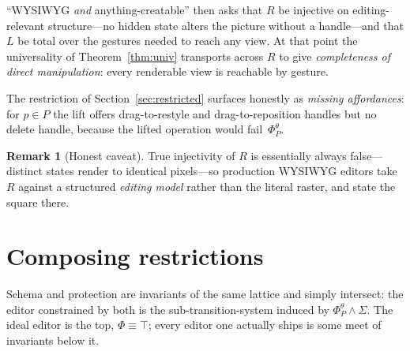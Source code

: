 \documentclass[11pt]{article}
\newcommand{\Edit}{\mathcal{E}}
\newcommand{\Render}{R}
\newcommand{\Lift}{L}
\theoremstyle{definition}
\newtheorem{remark}[definition]{Remark}
\theoremstyle{plain}
\begin{document}
``WYSIWYG \emph{and} anything-creatable'' then asks that $\Render$ be injective
on editing-relevant structure---no hidden state alters the picture without a
handle---and that $\Lift$ be total over the gestures needed to reach any view. At
that point the universality of Theorem~\ref{thm:univ} transports across
$\Render$ to give \emph{completeness of direct manipulation}: every renderable
view is reachable by gesture.

The restriction of Section~\ref{sec:restricted} surfaces honestly as
\emph{missing affordances}: for $p\in P$ the lift offers drag-to-restyle and
drag-to-reposition handles but no delete handle, because the lifted operation
would fail~$\Phi^{\theta}_{P}$.

\begin{remark}[Honest caveat]
True injectivity of $\Render$ is essentially always false---distinct states
render to identical pixels---so production WYSIWYG editors take $\Render$ against
a structured \emph{editing model} rather than the literal raster, and state the
square there.
\end{remark}

\section{Composing restrictions}\label{sec:compose}
Schema and protection are invariants of the same lattice and simply intersect:
the editor constrained by both is the sub-transition-system induced by
$\Phi^{\theta}_{P}\wedge\Sigma$. The ideal editor is the top, $\Phi\equiv\top$;
every editor one actually ships is some meet of invariants below it.

\begin{center}
\end{center}
\end{document}
